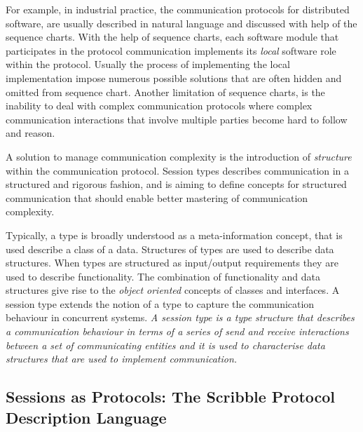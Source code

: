 For example, in industrial practice, the communication protocols for
distributed software, are usually described in natural language and
discussed with help of the sequence charts.
With the help of sequence charts,
each software module that participates in the
protocol communication implements
its \emph{local} software role within the protocol.
Usually the process of implementing the local implementation
impose numerous possible solutions that are often hidden and
omitted from sequence chart.
Another limitation of sequence charts, is the inability to deal with complex
communication protocols where complex communication interactions
that involve multiple parties become hard to follow and reason.

A solution to manage communication complexity
is the introduction of \emph{structure} within the communication protocol.
Session types describes communication in a structured and rigorous fashion,
and is aiming to define concepts for structured communication
that should enable better mastering of communication complexity.


Typically, a type is broadly understood
as a meta-information concept, that is used describe a class of a data.
Structures of types are used to describe data structures.
When types are structured as input/output requirements they
are used to describe functionality.
The combination of functionality and data structures give rise
to the \emph{object oriented} concepts of classes and interfaces.%
%
A session type extends %
the notion of a type to capture the communication behaviour in concurrent systems.
{\em A session type is a type structure that describes a communication
	behaviour in terms of a series of send and receive %
	interactions between a set of communicating entities and it is used
	to characterise data structures that are used to implement communication.}

\subsection{Sessions as Protocols: The Scribble Protocol Description Language}
\label{sec:sessions_scribble}

